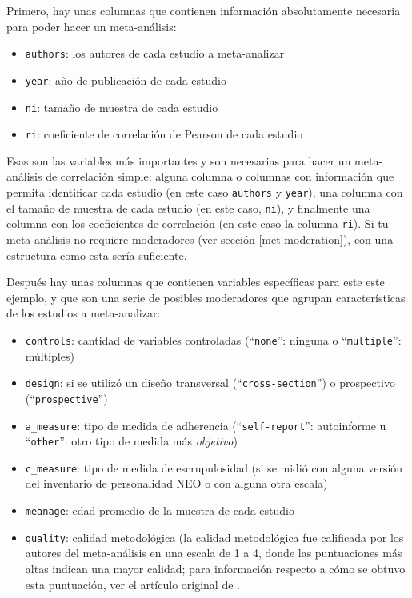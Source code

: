 \documentclass[
  bookmarksnumbered]{article}
\begin{document}
Primero, hay unas columnas que contienen información absolutamente necesaria para poder hacer un meta-análisis:

\begin{itemize}
\item
  \texttt{authors}: los autores de cada estudio a meta-analizar
\item
  \texttt{year}: año de publicación de cada estudio
\item
  \texttt{ni}: tamaño de muestra de cada estudio
\item
  \texttt{ri}: coeficiente de correlación de Pearson de cada estudio
\end{itemize}

Esas son las variables más importantes y son necesarias para hacer un meta-análisis de correlación simple: alguna columna o columnas con información que permita identificar cada estudio (en este caso \texttt{authors} y \texttt{year}), una columna con el tamaño de muestra de cada estudio (en este caso, \texttt{ni}), y finalmente una columna con los coeficientes de correlación (en este caso la columna \texttt{ri}). Si tu meta-análisis no requiere moderadores (ver sección \ref{met-moderation}), con una estructura como esta sería suficiente.

Después hay unas columnas que contienen variables específicas para este este ejemplo, y que son una serie de posibles moderadores que agrupan características de los estudios a meta-analizar:

\begin{itemize}
\item
  \texttt{controls}: cantidad de variables controladas (``\texttt{none}'': ninguna o ``\texttt{multiple}'': múltiples)
\item
  \texttt{design}: si se utilizó un diseño transversal (``\texttt{cross-section}'') o prospectivo (``\texttt{prospective}'') \autocite[para más información acerca de estos tipos de diseño, ver por ejemplo][]{Manterola2019}
\item
  \texttt{a\_measure}: tipo de medida de adherencia (``\texttt{self-report}'': autoinforme u ``\texttt{other}'': otro tipo de medida más \emph{objetivo})
\item
  \texttt{c\_measure}: tipo de medida de escrupulosidad (si se midió con alguna versión del inventario de personalidad NEO o con alguna otra escala)
\item
  \texttt{meanage}: edad promedio de la muestra de cada estudio
\item
  \texttt{quality}: calidad metodológica (la calidad metodológica fue calificada por los autores del meta-análisis en una escala de 1 a 4, donde las puntuaciones más altas indican una mayor calidad; para información respecto a cómo se obtuvo esta puntuación, ver el artículo original de \textcite{molloy2013}.
\end{itemize}
\end{document}
